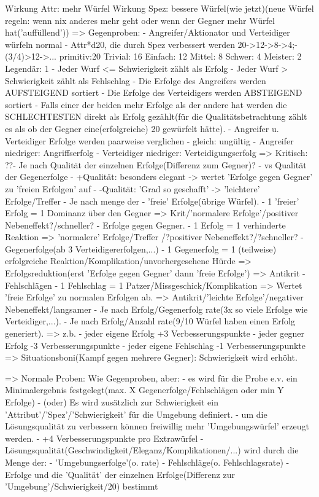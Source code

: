 	Wirkung Attr: mehr Würfel
	Wirkung Spez: bessere Würfel(wie jetzt)(neue Würfel regeln: wenn nix anderes mehr geht oder wenn der Gegner mehr Würfel hat('auffüllend'))	
	=> Gegenproben:
		- Angreifer/Aktionator und Verteidiger würfeln normal
			- Attr*d20, die durch Spez verbessert werden
				20->12->8->4;-(3/4)>12->...
				primitiv:20
				Trivial: 16
				Einfach: 12
				Mittel:   8
				Schwer:   4
				Meister:  2
				Legendär: 1
			- Jeder Wurf <= Schwierigkeit zählt als Erfolg
			- Jeder Wurf > Schwierigkeit zählt als Fehlschlag
		- Die Erfolge des Angreifers werden AUFSTEIGEND sortiert
		- Die Erfolge des Verteidigers werden ABSTEIGEND sortiert
		- Falls einer der beiden mehr Erfolge als der andere hat werden die SCHLECHTESTEN direkt als Erfolg gezählt(für die Qualitätsbetrachtung zählt es als ob der Gegner eine(erfolgreiche) 20 gewürfelt hätte).
		- Angreifer u. Verteidiger Erfolge werden paarweise verglichen
			- gleich: ungültig
			- Angreifer niedriger: Angriffserfolg
			- Verteidiger niedriger: Verteidigungserfolg
		=> Kritisch:
			??- Je nach Qualität der einzelnen Erfolge(Differenz zum Gegner)?
				- vs Qualität der Gegenerfolge
				- +Qualität: besonders elegant
					-> wertet 'Erfolge gegen Gegner' zu 'freien Erfolgen' auf
				- -Qualität: 'Grad so geschafft'
					-> 'leichtere' Erfolge/Treffer
			- Je nach menge der
				- 'freie' Erfolge(übrige Würfel).
					- 1 'freier' Erfolg = 1 Dominanz über den Gegner
					=> Krit/'normalere Erfolge'/positiver Nebeneffekt?/schneller?
				- Erfolge gegen Gegner.
					- 1 Erfolg = 1 verhinderte Reaktion
					=> 'normalere' Erfolge/Treffer /?positiver Nebeneffekt?/?schneller?
				- Gegenerfolge(ab 3 Verteidigererfolgen,...)
					- 1 Gegenerfolg = 1 (teilweise) erfolgreiche Reaktion/Komplikation/unvorhergesehene Hürde
					=> Erfolgsreduktion(erst 'Erfolge gegen Gegner' dann 'freie Erfolge')
					=> Antikrit
				- Fehlschlägen
					- 1 Fehlschlag = 1 Patzer/Missgeschick/Komplikation
					=> Wertet 'freie Erfolge' zu normalen Erfolgen ab.
					=> Antikrit/'leichte Erfolge'/negativer Nebeneffekt/langsamer
			- Je nach Erfolg/Gegenerfolg rate(3x so viele Erfolge wie Verteidiger,...).
			- Je nach Erfolg/Anzahl rate(9/10 Würfel haben einen Erfolg generiert).
			=> z.b. 
				- jeder eigene Erfolg +3 Verbesserungspunkte
				- jeder gegner Erfolg -3 Verbesserungspunkte
				- jeder eigene Fehlschlag -1 Verbesserungspunkte
		=> Situationsboni(Kampf gegen mehrere Gegner): Schwierigkeit wird erhöht.


	=> Normale Proben: Wie Gegenproben, aber:
		- es wird für die Probe e.v. ein Minimalergebnis festgelegt(max. X Gegenerfolge/Fehlschlägen oder min Y Erfolge)
		- (oder) Es wird zusätzlich zur Schwierigkeit ein 'Attribut'/'Spez'/'Schwierigkeit' für die Umgebung definiert.
		- um die Lösungsqualität zu verbessern können freiwillig mehr 'Umgebungswürfel' erzeugt werden.
			- +4 Verbesserungspunkte pro Extrawürfel
		- Lösungsqualität(Geschwindigkeit/Eleganz/Komplikationen/...) wird durch die Menge der:
			- 'Umgebungserfolge'(o. rate)
			- Fehlschläge(o. Fehlschlagsrate)
			- Erfolge
		und die 'Qualität' der einzelnen Erfolge(Differenz zur 'Umgebung'/Schwierigkeit/20) bestimmt


